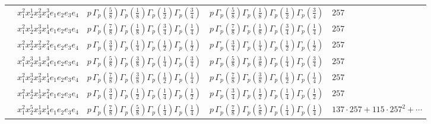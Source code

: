 \documentclass[11pt]{article}
\begin{document}
\begin{table}[ht]
{\begin{tabular}{@{}lllll@{}}
 & $x_{1}^{2} x_{2}^{1} x_{3}^{2} x_{4}^{3}  e_{1} e_{2} e_{3} e_{4}$ & $p \, \Gamma_p \left( \frac{5}{8} \right) \Gamma_p \left( \frac{1}{8} \right) \Gamma_p \left( \frac{1}{2} \right) \Gamma_p \left( \frac{3}{4} \right)$ & $p \, \Gamma_p \left( \frac{5}{8} \right) \Gamma_p \left( \frac{1}{8} \right) \Gamma_p \left( \frac{1}{2} \right) \Gamma_p \left( \frac{3}{4} \right)$ & $257$ \\
 & $x_{1}^{2} x_{2}^{1} x_{3}^{3} x_{4}^{1}  e_{1} e_{2} e_{3} e_{4}$ & $p \, \Gamma_p \left( \frac{7}{8} \right) \Gamma_p \left( \frac{1}{8} \right) \Gamma_p \left( \frac{3}{4} \right) \Gamma_p \left( \frac{1}{4} \right)$ & $p \, \Gamma_p \left( \frac{7}{8} \right) \Gamma_p \left( \frac{1}{8} \right) \Gamma_p \left( \frac{3}{4} \right) \Gamma_p \left( \frac{1}{4} \right)$ & $257$ \\
 & $x_{1}^{2} x_{2}^{2} x_{3}^{2} x_{4}^{2}  e_{1} e_{2} e_{3} e_{4}$ & $p \, \Gamma_p \left( \frac{3}{4} \right) \Gamma_p \left( \frac{1}{4} \right) \Gamma_p \left( \frac{1}{2} \right) \Gamma_p \left( \frac{1}{2} \right)$ & $p \, \Gamma_p \left( \frac{3}{4} \right) \Gamma_p \left( \frac{1}{4} \right) \Gamma_p \left( \frac{1}{2} \right) \Gamma_p \left( \frac{1}{2} \right)$ & $257$ \\
 & $x_{1}^{2} x_{2}^{3} x_{3}^{1} x_{4}^{3}  e_{1} e_{2} e_{3} e_{4}$ & $p \, \Gamma_p \left( \frac{5}{8} \right) \Gamma_p \left( \frac{3}{8} \right) \Gamma_p \left( \frac{1}{4} \right) \Gamma_p \left( \frac{3}{4} \right)$ & $p \, \Gamma_p \left( \frac{5}{8} \right) \Gamma_p \left( \frac{3}{8} \right) \Gamma_p \left( \frac{1}{4} \right) \Gamma_p \left( \frac{3}{4} \right)$ & $257$ \\
 & $x_{1}^{2} x_{2}^{3} x_{3}^{2} x_{4}^{1}  e_{1} e_{2} e_{3} e_{4}$ & $p \, \Gamma_p \left( \frac{7}{8} \right) \Gamma_p \left( \frac{3}{8} \right) \Gamma_p \left( \frac{1}{2} \right) \Gamma_p \left( \frac{1}{4} \right)$ & $p \, \Gamma_p \left( \frac{7}{8} \right) \Gamma_p \left( \frac{3}{8} \right) \Gamma_p \left( \frac{1}{2} \right) \Gamma_p \left( \frac{1}{4} \right)$ & $257$ \\
 & $x_{1}^{2} x_{2}^{4} x_{3}^{1} x_{4}^{2}  e_{1} e_{2} e_{3} e_{4}$ & $p \, \Gamma_p \left( \frac{3}{4} \right) \Gamma_p \left( \frac{1}{2} \right) \Gamma_p \left( \frac{1}{4} \right) \Gamma_p \left( \frac{1}{2} \right)$ & $p \, \Gamma_p \left( \frac{3}{4} \right) \Gamma_p \left( \frac{1}{2} \right) \Gamma_p \left( \frac{1}{4} \right) \Gamma_p \left( \frac{1}{2} \right)$ & $257$ \\
 & $x_{1}^{2} x_{2}^{5} x_{3}^{1} x_{4}^{1}  e_{1} e_{2} e_{3} e_{4}$ & $p \, \Gamma_p \left( \frac{7}{8} \right) \Gamma_p \left( \frac{5}{8} \right) \Gamma_p \left( \frac{1}{4} \right) \Gamma_p \left( \frac{1}{4} \right)$ & $p \, \Gamma_p \left( \frac{7}{8} \right) \Gamma_p \left( \frac{5}{8} \right) \Gamma_p \left( \frac{1}{4} \right) \Gamma_p \left( \frac{1}{4} \right)$ & $137{\cdot}257{+}115{\cdot}257^{2}{+}\cdots$ \\

\end{tabular}}
\end{table}
\end{document}
